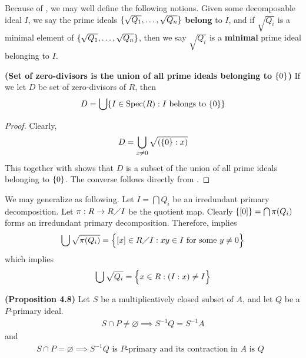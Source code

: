 \documentclass{report}
\begin{document}
Because of , we may well define the following notions. Given some decomposable ideal $I$, we say the prime ideals $\{ \sqrt{Q_1},\dots ,\sqrt{Q_n}  \}$ \textbf{belong} to $I$, and if $\sqrt{Q_i}$ is a minimal element of $\{ \sqrt{Q_1},\dots ,\sqrt{Q_n} \}$, then we say $\sqrt{Q_i}$ is a \textbf{minimal} prime ideal belonging to $I$. 
\begin{theorem}
\label{Soz}
  \textbf{(Set of zero-divisors is the union of all prime ideals belonging to $\{ 0 \}$)} If we let $D$ be set of zero-divisors of  $R$, then 
\begin{align*}
D= \bigcup \{ I\in \operatorname{Spec}(R):I\text{ belongs to }\{ 0 \} \} 
\end{align*}
\end{theorem}
\begin{proof}
Clearly, 
\begin{align*}
D= \bigcup_{x\neq 0} \sqrt{(\{ 0 \}:x)} 
\end{align*}
This together with  shows that $D$ is a subset of the union of all prime ideals belonging to $\{ 0 \}$. The converse follows directly from . 
\end{proof}
We may generalize  as following. Let $I = \bigcap Q_i$ be an irredundant primary decomposition. Let $\pi  :R \rightarrow R\diagup I$ be the quotient map. Clearly $\{ [0] \}= \bigcap \pi  (Q_i)$ forms an irredundant primary decomposition. Therefore,  implies 
\begin{align*}
\bigcup   \sqrt{\pi  (Q_i)}= \Big\{ [x] \in R\diagup I: xy \in I\text{ for some }y\neq 0 \Big\} 
\end{align*}
which implies 
\begin{align*}
\bigcup \sqrt{Q_i} = \Big\{ x \in R: (I:x) \neq I \Big\}
\end{align*}
\begin{theorem}
\textbf{(Proposition 4.8)} Let $S$ be a multiplicatively closed subset of  $A$, and let  $Q$ be a $P$-primary ideal. 
 \begin{align*}
S \cap P \neq \varnothing \implies  S^{-1}Q = S^{-1}A
\end{align*}
and 
\begin{align*}
S \cap P=\varnothing \implies S^{-1}Q\text{ is $P$-primary  and its contraction in $A$ is  $Q$ }
\end{align*}
\end{theorem}
\end{document}
